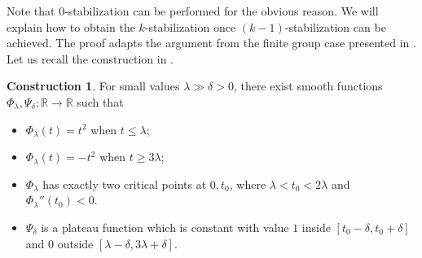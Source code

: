 \documentclass[11pt]{amsart}
\theoremstyle{definition}
\newtheorem{construction}[theorem]{Construction}
\numberwithin{equation}{subsection}
\begin{document}



Note that $0$-stabilization can be performed for the obvious reason. We will explain how to obtain the $k$-stabilization once $(k-1)$-stabilization can be achieved. The proof adapts the argument from the finite group case presented in \cite{bao2024morse}. Let us recall the construction in \cite[Corollary 6.4]{bao2024morse}.

\begin{construction}\label{construction:function}
    For small values $\lambda\gg \delta >0$, there exist smooth functions $\Phi_{\lambda},\Psi_{\delta}:\mathbb{R}\rightarrow\mathbb{R}$ such that
    \begin{itemize}
        \item $\Phi_{\lambda}(t)=t^2$ when $t\leq \lambda$;
        \item $\Phi_{\lambda}(t)=-t^2$ when $t\geq 3\lambda$;
        \item $\Phi_{\lambda}$ has exactly two critical points at $0,t_0$, where $\lambda<t_0<2\lambda$ and $\Phi_{\lambda}''(t_0)<0$.
        \item $\Psi_{\delta}$ is a plateau function which is constant with value $1$ inside $[t_0-\delta,t_0+\delta]$ and $0$ outside $[\lambda-\delta,3\lambda+\delta]$. 
    \end{itemize}
\end{construction}
\end{document}
